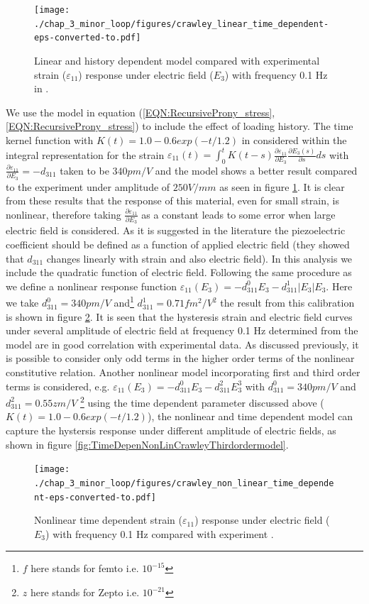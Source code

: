 \begin{figure} 
\centering
\texttt{[image: ./chap\_3\_minor\_loop/figures/crawley\_linear\_time\_dependent-eps-converted-to.pdf]}
\caption{Linear and history dependent model compared with experimental strain ($\varepsilon_{11}$) response under electric field ($E_3$) with frequency 0.1 Hz in \cite{Crawley1990}.}
\label{fig:Crawley_xp_His_dependent_Lin}
\end{figure}

We use the model in equation (\ref{EQN:RecursiveProny_stress}, \ref{EQN:RecursiveProny_stress}) \cite{tscharnuter2012nonlinear} to include the effect of loading history. 
The time kernel function with $K(t)=1.0-0.6 exp(-t/1.2)$ in considered within the integral representation for the strain $\varepsilon_{11}(t)=\int_0^t
K(t-s)\frac{\partial \varepsilon_{11}}{\partial E_3}\frac{\partial
E_3(s)}{\partial s} ds$ with $\frac{\partial \varepsilon_{11}}{\partial
E_3}=-d_{311}$ taken to be $340 pm/V$ and the model shows a better result compared to the experiment under amplitude of $250V/mm$ as seen in figure \ref{fig:Crawley_xp_His_dependent_Lin}. 
It is clear from these results that the response of this material, even for small strain, is nonlinear, therefore taking $\frac{\partial\varepsilon_{11}}{\partial E_3}$ as a constant leads to some error when large electric field is considered.
As it is suggested in the literature \cite{anderson1989piezoceramic,Crawley1990} the piezoelectric coefficient should be defined as a function of applied electric field (they showed that $d_{311}$ changes linearly with strain and also electric field).
In this analysis we include the quadratic function of electric field. 
Following the same procedure as \cite{tscharnuter2012nonlinear} we define a nonlinear response function $\varepsilon_{11}(E_3)=-d_{311}^0 E_3-d_{311}^1 |E_3| E_3$.
Here we take $d_{311}^0=340pm/V$ and\footnote{$f$ here stands for femto i.e. $10^{-15}$ } $d_{311}^1=0.71 fm^2/V^2 $ the result from this calibration is shown in figure \ref{fig:TimeDepenNonLinCrawley}. It is seen that the hysteresis strain and electric field curves under several amplitude of electric field at frequency 0.1 Hz determined from the model are in good correlation with experimental data.
As discussed previously, it is possible to consider only odd terms in the higher order terms of the nonlinear constitutive relation.
Another nonlinear model incorporating first and third order terms is considered, e.g. $\varepsilon_{11}(E_3)=-d_{311}^0 E_3-d_{311}^2 E_3^3$ with $d_{311}^0=340pm/V$ and $d_{311}^2=0.55 z m/V$ \footnote{$z$ here stands for Zepto i.e. $10^{-21}$ } using the time dependent parameter discussed above ($K(t)=1.0-0.6 exp(-t/1.2)$), 
the nonlinear and time dependent model can capture the hystersis response under different amplitude of electric fields, as shown in figure \ref{fig:TimeDepenNonLinCrawleyThirdordermodel}. 
\begin{figure}
\centering
\texttt{[image: ./chap\_3\_minor\_loop/figures/crawley\_non\_linear\_time\_dependent-eps-converted-to.pdf]}
\caption{Nonlinear time dependent strain ($\varepsilon_{11}$) response under electric field ($E_3$) with frequency 0.1 Hz compared with experiment \cite{Crawley1990}.}
\label{fig:TimeDepenNonLinCrawley}
\end{figure}

